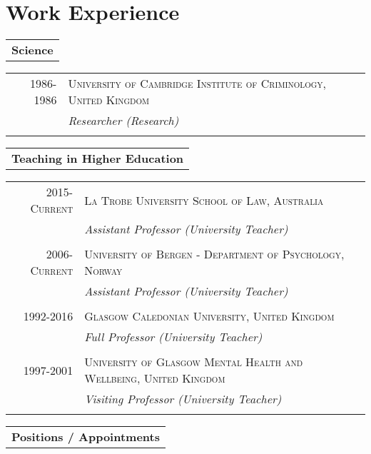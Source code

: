 \documentclass [a4paper,10pt]{article}
\begin{document}
\section{Work Experience}
\begin{tabular}{r}
\\\large
\textbf{Science}
\normalsize
\end{tabular}

\begin{tabular}{r|p{11cm}} 
\textsc{1986-1986} 
& \textsc{University of Cambridge Institute of Criminology, United Kingdom} \\ \textsc{} & \emph{Researcher (Research)}  \\ \multicolumn{2}{c}{} \\
\end{tabular}

\begin{tabular}{r}
\large
\textbf{Teaching in Higher Education}
\normalsize
\end{tabular}

\begin{tabular}{r|p{11cm}} 
\textsc{2015-Current} 
& \textsc{La Trobe University School of Law, Australia} \\ \textsc{} & \emph{Assistant Professor (University Teacher)}  \\ \multicolumn{2}{c}{} \\
\textsc{2006-Current} 
& \textsc{University of Bergen - Department of Psychology, Norway} \\ \textsc{} & \emph{Assistant Professor (University Teacher)}  \\ \multicolumn{2}{c}{} \\
\textsc{1992-2016} 
& \textsc{Glasgow Caledonian University, United Kingdom} \\ \textsc{} & \emph{Full Professor (University Teacher)}  \\ \multicolumn{2}{c}{} \\
\textsc{1997-2001} 
& \textsc{University of Glasgow Mental Health and Wellbeing, United Kingdom} \\ \textsc{} & \emph{Visiting Professor (University Teacher)}  \\ \multicolumn{2}{c}{} \\
\end{tabular}

\begin{tabular}{r}
\large
\textbf{Positions / Appointments}
\normalsize
\end{tabular}
\end{document}
